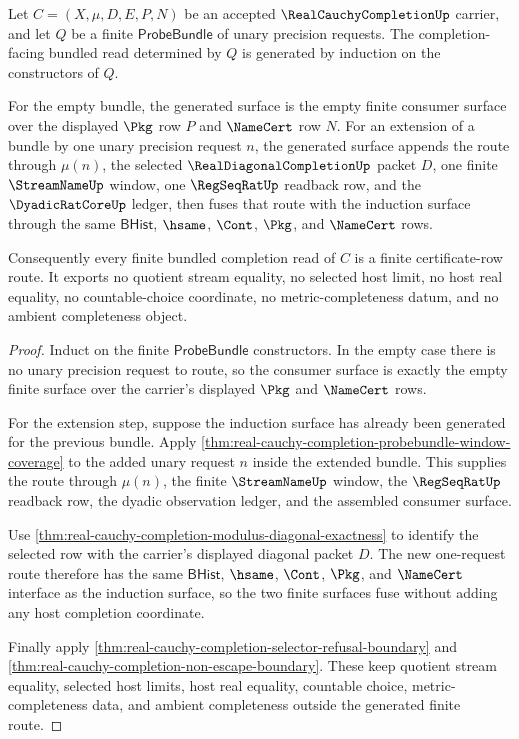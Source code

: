 \begin{theorem}
\label{thm:real-cauchy-completion-finite-bundle-induction}
Let $C=(X,\mu,D,E,P,N)$ be an accepted $\RealCauchyCompletionUp$ carrier, and let $Q$ be a finite $\mathsf{ProbeBundle}$ of unary precision requests. The completion-facing bundled read determined by $Q$ is generated by induction on the constructors of $Q$.

For the empty bundle, the generated surface is the empty finite consumer surface over the displayed $\Pkg$ row $P$ and $\NameCert$ row $N$. For an extension of a bundle by one unary precision request $n$, the generated surface appends the route through $\mu(n)$, the selected $\RealDiagonalCompletionUp$ packet $D$, one finite $\StreamNameUp$ window, one $\RegSeqRatUp$ readback row, and the $\DyadicRatCoreUp$ ledger, then fuses that route with the induction surface through the same $\mathsf{BHist}$, $\hsame$, $\Cont$, $\Pkg$, and $\NameCert$ rows.

Consequently every finite bundled completion read of $C$ is a finite certificate-row route. It exports no quotient stream equality, no selected host limit, no host real equality, no countable-choice coordinate, no metric-completeness datum, and no ambient completeness object.
\end{theorem}
\begin{proof}
Induct on the finite $\mathsf{ProbeBundle}$ constructors. In the empty case there is no unary precision request to route, so the consumer surface is exactly the empty finite surface over the carrier's displayed $\Pkg$ and $\NameCert$ rows.

For the extension step, suppose the induction surface has already been generated for the previous bundle. Apply \autoref{thm:real-cauchy-completion-probebundle-window-coverage} to the added unary request $n$ inside the extended bundle. This supplies the route through $\mu(n)$, the finite $\StreamNameUp$ window, the $\RegSeqRatUp$ readback row, the dyadic observation ledger, and the assembled consumer surface.

Use \autoref{thm:real-cauchy-completion-modulus-diagonal-exactness} to identify the selected row with the carrier's displayed diagonal packet $D$. The new one-request route therefore has the same $\mathsf{BHist}$, $\hsame$, $\Cont$, $\Pkg$, and $\NameCert$ interface as the induction surface, so the two finite surfaces fuse without adding any host completion coordinate.

Finally apply \autoref{thm:real-cauchy-completion-selector-refusal-boundary} and \autoref{thm:real-cauchy-completion-non-escape-boundary}. These keep quotient stream equality, selected host limits, host real equality, countable choice, metric-completeness data, and ambient completeness outside the generated finite route.
\end{proof}

